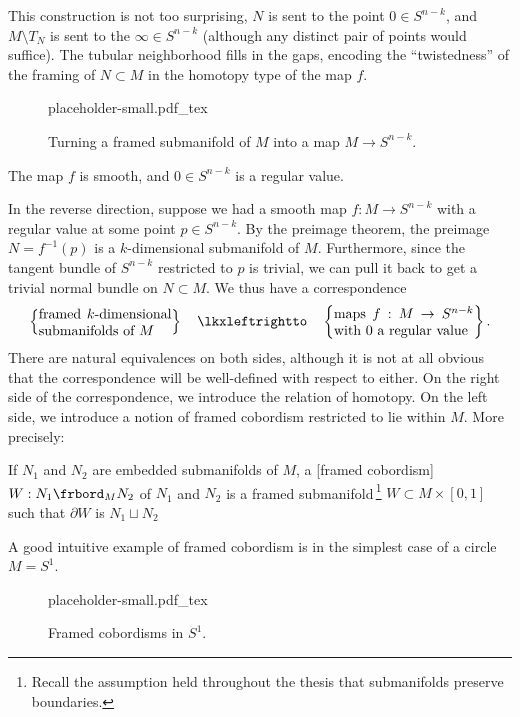 This construction is not too surprising, $N$ is sent to the point $0\in S^{n-k}$, and $M\setminus T_N$ is sent to the $\infty \in S^{n-k}$ (although any distinct pair of points would suffice). The tubular neighborhood fills in the gaps, encoding the ``twistedness'' of the framing of $N\subset M$ in the homotopy type of the map $f$.

\begin{figure}[ht]
	{placeholder-small.pdf_tex}
	\caption{Turning a framed submanifold of $M$ into a map $M\to S^{n-k}$.}\label{fig:pontryagin-thom-forward}
\end{figure}

\begin{proposition}
	The map $f$ is smooth, and $0\in S^{n-k}$ is a regular value.
\end{proposition}

In the reverse direction, suppose we had a smooth map $f : M \to S^{n-k}$ with a regular value at some point $p\in S^{n-k}$. By the preimage theorem, the preimage $N=f^{-1}(p)$ is a $k$-dimensional submanifold of $M$. Furthermore, since the tangent bundle of $S^{n-k}$ restricted to $p$ is trivial, we can pull it back to get a trivial normal bundle on $N\subset M$. We thus have a correspondence
\[
	\left\{\parbox{9.5em}{framed $k$-dimensional submanifolds of $M$}\right\}
	\quad\lkxleftrightto\quad
	\left\{
		\parbox{10em}{maps $f : M \to S^{n-k}$ with $0$ a regular value}
	\right\}.
\]
There are natural equivalences on both sides, although it is not at all obvious that the correspondence will be well-defined with respect to either.
On the right side of the correspondence, we introduce the relation of homotopy. On the left side, we introduce a notion of framed cobordism restricted to lie within $M$. More precisely:

\begin{definition}
	If $N_1$ and $N_2$ are embedded submanifolds of $M$, a [framed cobordism] $W : N_1 \frbord_{M} N_2$ of $N_1$ and $N_2$ is a framed submanifold\,\footnote{Recall the assumption held throughout the thesis that submanifolds preserve boundaries.} $W\subset M\times [0,1]$ such that $\partial W$ is $N_1\sqcup N_2$
\end{definition}

\begin{example}
	A good intuitive example of framed cobordism is in the simplest case of a circle $M=S^1$.

\begin{figure}[ht]
	{placeholder-small.pdf_tex}
	\caption{Framed cobordisms in $S^1$.}
\end{figure}
\end{example}


